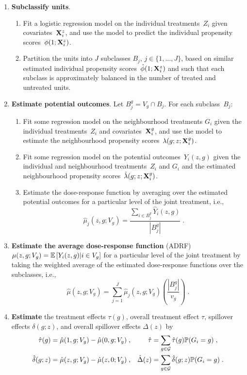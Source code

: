 \documentclass[10pt]{article}
\begin{document}
\begin{enumerate}

\item
\textbf{Subclassify units}.
\begin{enumerate}
\item
Fit a logistic regression model on the individual treatments~$Z_i$ given covariates~$\mathbf{X}_i^z$, and use the model to predict the individual propensity scores~$\phi(1;\mathbf{X}_i^z)$.
\item
Partition the units into $J$ subclasses $B_j$, $j\in\{1,\ldots,J\}$, based on similar estimated individual propensity scores~$\hat{\phi}(1;\mathbf{X}_i^z)$ and such that each subclass is approximately balanced in the number of treated and untreated units.
\end{enumerate}

\item
\textbf{Estimate potential outcomes}. Let $B_j^g=	V_g\cap B_j$. For each subclass~$B_j$:
\begin{enumerate}
\item
Fit some regression model on the neighbourhood treatments $G_i$ given the individual treatments~$Z_i$ and covariates~$\mathbf{X}_i^g$, and use the model to estimate the neighbourhood propensity scores~$\lambda(g;z;\mathbf{X}_i^g)$.
\item
Fit some regression model on the potential outcomes~$Y_i(z,g)$ given the individual and neighbourhood treatments~$Z_i$ and $G_i$ and the estimated neighbourhood propensity scores~$\hat{\lambda}(g;z;\mathbf{X}_i^g)$.
\item
Estimate the dose-response function by averaging over the estimated potential outcomes for a particular level of the joint treatment, i.e.,
\[
\hat{\mu}_j(z,g;V_g) = \frac{\sum_{i\in B_j^g}\hat{Y}_i(z,g)}{\left|B_j^g\right|}\;.
\]
\end{enumerate}

\item
\textbf{Estimate the average dose-response function} (ADRF) $\mu(z,g;V_g)=\mathbb{E}\left[Y_i(z,g)|i\in V_g\right]$ for a particular level of the joint treatment by taking the weighted average of the estimated dose-response functions over the subclasses, i.e.,
\[
\hat{\mu}(z,g;V_g) = \sum_{j=1}^J\hat{\mu}_j(z,g;V_g)\left(\frac{\left|B_j^g\right|}{v_g}\right) \;.
\]

\item
\textbf{Estimate} the treatment effects $\tau(g)$, overall treatment effect $\tau$, spillover effects $\delta(g;z)$, and overall spillover effects $\Delta(z)$ by
\begin{align*}
\hat{\tau}(g) &= \hat{\mu}(1,g;V_g) - \hat{\mu}(0,g;V_g) \;, & \hat{\tau}&=\sum_{g\in\mathcal{G}}\hat{\tau}(g)\mathbb{P}(G_i=g) \;, \\
\hat{\delta}(g;z) &= \hat{\mu}(z,g;V_g) - \hat{\mu}(z,0;V_g) \;, & \hat{\Delta}(z) &= \sum_{g\in\mathcal{G}}\hat{\delta}(g;z)\mathbb{P}(G_i=g)\;.
\end{align*}

\end{enumerate}
\end{document}

